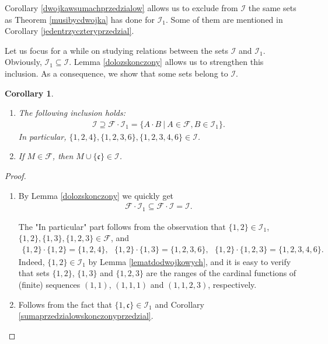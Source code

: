 \documentclass{amsart}
\newtheorem{corollary}[theorem]{Corollary}
\theoremstyle{definition}
\begin{document}
Corollary \ref{dwojkawsumachprzedzialow} allows us to exclude from $\mathcal{I}$ the same sets as Theorem \ref{musibycdwojka} has done for $\mathcal{I}_1$. Some of them are mentioned in Corollary \ref{jedentrzyczteryprzedzial}.

\bigskip

Let us focus for a while on studying relations between the sets $\mathcal{I}$ and $\mathcal{I}_{1}$. Obviously, $\mathcal{I}_{1}\subseteq \mathcal{I}$. Lemma \ref{dolozskonczony} allows us to strengthen this inclusion. As a consequence, we show that some sets belong to $\mathcal{I}$.

\begin{corollary}\label{CorFI1inI}
	\begin{enumerate}[label={(\arabic*)},ref={\thecorollary(\arabic*)}]
	\item The following inclusion holds: 
	\begin{align*}
	\mathcal{I}\supseteq \mathcal{F}\cdot \mathcal{I}_1=\{A\cdot B\ |\ A\in \mathcal{F}, B\in \mathcal{I}_1\}.
	\end{align*}
	In particular, %
	$\{1,2,4\},\{1,2,3,6\}, \{1,2,3,4,6\}\in \mathcal{I}$. \label{sumaprzedzialowskonczonyprzedzial}
	\item If $M\in \mathcal{F}$, then $M\cup\{\mathfrak{c}\}\in \mathcal{I}$.
	\end{enumerate}
\end{corollary}
\begin{proof}
	\begin{enumerate}
	\item By Lemma \ref{dolozskonczony} we quickly get
	\begin{align*}
		\mathcal{F}\cdot\mathcal{I}_{1} \subseteq \mathcal{F}\cdot\mathcal{I} = \mathcal{I}.
	\end{align*}
	
	The "In particular" part follows from the observation that $\{1,2\}\in \mathcal{I}_{1}$, $\{1,2\},\{1,3\},\{1,2,3\}\in\mathcal{F}$, and
		\begin{align*}
			\{1,2\}\cdot\{1,2\} = \{1,2,4\}, \ \ \ \{1,2\}\cdot \{1,3\} = \{1,2,3,6\}, \ \ \ \{1,2\}\cdot \{1,2,3\} = \{1,2,3,4,6\}.
		\end{align*}
		Indeed, $\{1,2\}\in\mathcal{I}_{1}$ by Lemma \ref{lematdodwojkowych}, and it is easy to verify that sets $\{1,2\}$, $\{1,3\}$ and $\{1,2,3\}$ are the ranges of the cardinal functions of (finite) sequences $(1,1)$, $(1,1,1)$ and $(1,1,2,3)$, respectively.
		\item Follows from the fact that $\{1,\mathfrak{c}\}\in \mathcal{I}_1$ and Corollary \ref{sumaprzedzialowskonczonyprzedzial}.
	\end{enumerate}
\end{proof}
\end{document}
